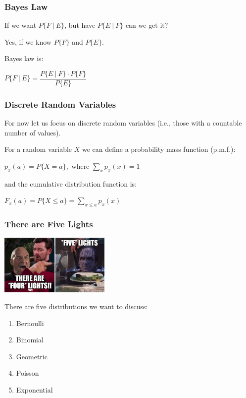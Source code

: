 \begin{frame}
\frametitle{Bayes Law}

If we want $P\{ F~|~E \}$, but have $P\{ E~|~F \}$ can we get it? 

Yes, if we know $P\{F\}$ and $P\{E\}$. 

Bayes law is:

\begin{center}
	$P\{F~|~E\} = \dfrac{P\{E~|~F\} \cdot P\{F\}}{P\{E\}}$
\end{center}


\end{frame}



\begin{frame}
\frametitle{Discrete Random Variables}


For now let us focus on discrete random variables (i.e., those with a countable number of values). 

For a random variable $X$ we can define a probability mass function (p.m.f.):

\begin{center}
	$p_{x}(a) = P \{ X = a \},$ where $\sum\limits_{x}^{~} p_{x}(x) = 1$
\end{center}
	and the cumulative distribution function is:
\begin{center}
	$F_{x}(a) = P \{ X \leq a \} = \sum\limits_{x \leq a} p_{x}(x)$
\end{center}


\end{frame}



\begin{frame}
\frametitle{There are Five Lights}

\begin{center}
	\includegraphics[width=0.4\textwidth]{images/fourlights.jpg}
\end{center}

There are five distributions we want to discuss: 

\begin{enumerate}
	\item Bernoulli 
	\item Binomial
	\item Geometric
	\item Poisson
	\item Exponential
\end{enumerate}

\end{frame}



